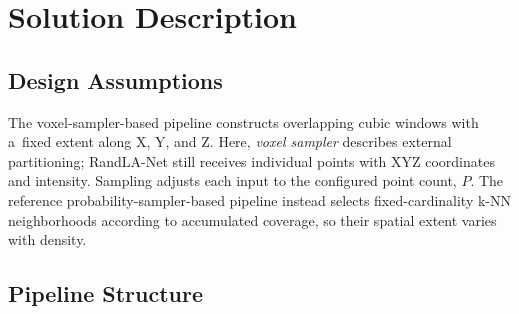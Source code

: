 \clearpage
\section{Solution Description}
\label{sec:solution}

\subsection{Design Assumptions}

The voxel-sampler-based pipeline constructs overlapping cubic windows with a~fixed extent along X, Y, and Z. Here, \emph{voxel sampler} describes external partitioning; RandLA-Net still receives individual points with XYZ coordinates and intensity. Sampling adjusts each input to the configured point count, $P$. The reference probability-sampler-based pipeline instead selects fixed-cardinality k-NN neighborhoods according to accumulated coverage, so their spatial extent varies with density.

\subsection{Pipeline Structure}

